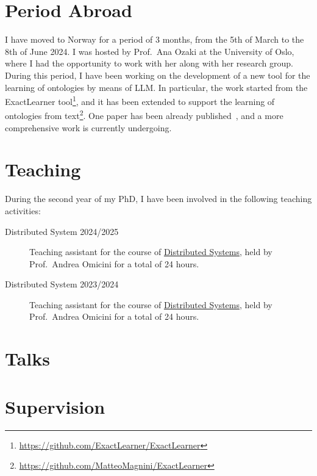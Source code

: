\documentclass[
]{ceurart}
\begin{document}
\section{Period Abroad}
\label{sec:period-abroad}

I have moved to Norway for a period of 3 months, from the 5th of March to the 8th of June 2024.
%
I was hosted by Prof.~Ana Ozaki at the University of Oslo, where I had the opportunity to work with her along with her research group.
%
During this period, I have been working on the development of a new tool for the learning of ontologies by means of \ac{LLM}.
%
In particular, the work started from the ExactLearner tool\footnote{\url{https://github.com/ExactLearner/ExactLearner}}, and it has been extended to support the learning of ontologies from text\footnote{\url{https://github.com/MatteoMagnini/ExactLearner}}.
%
One paper has been already published~\cite{DBLP:conf/dlog/MagniniOS24}, and a more comprehensive work is currently undergoing.

\section{Teaching}
\label{sec:results}

During the second year of my PhD, I have been involved in the following teaching activities:
%
\begin{description}
    \item[Distributed System 2024/2025] Teaching assistant for the course of \href{https://www.unibo.it/it/studiare/dottorati-master-specializzazioni-e-altra-formazione/insegnamenti/insegnamento/2024/493397}{Distributed Systems}, held by Prof.~Andrea Omicini for a total of 24 hours.
    \item[Distributed System 2023/2024] Teaching assistant for the course of \href{https://www.unibo.it/it/studiare/dottorati-master-specializzazioni-e-altra-formazione/insegnamenti/insegnamento/2023/493397}{Distributed Systems}, held by Prof.~Andrea Omicini for a total of 24 hours.
\end{description}

\section{Talks}
\label{sec:talks}

\section{Supervision}
\label{sec:supervision}
\end{document}
